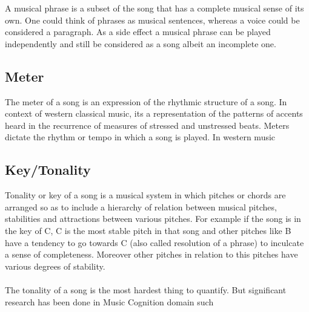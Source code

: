 \noindent A musical phrase is a subset of the song that has a complete musical sense of its own. One could think of phrases as musical sentences, whereas a voice could be considered a paragraph. As a side effect a musical phrase can be played independently and still be considered as a song albeit an incomplete one. 

\subsection{Meter}

\noindent The meter of a song is an expression of the rhythmic structure of a song. In context of western classical music, its a representation of the patterns of accents heard in the recurrence of measures of stressed and unstressed beats. Meters dictate the rhythm or tempo in which a song is played. In western music 

\subsection{Key/Tonality}

\noindent Tonality or key of a song is a musical system in which pitches or chords are arranged so as to include a hierarchy of relation between musical pitches, stabilities and attractions between various pitches. For example if the song is in the key of C, C is the most stable pitch in that song and other pitches like B have a tendency to go towards C (also called resolution of a phrase) to inculcate a sense of completeness. Moreover other pitches in relation to this pitches have various degrees of stability. \\\\
The tonality of a song is the most hardest thing to quantify. But significant research has been done in Music Cognition domain such 